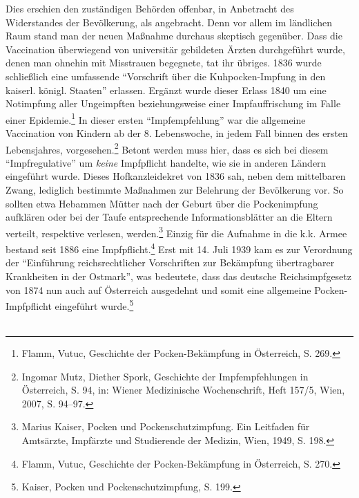 \documentclass[
    a4paper,
    12pt,
    hyphens,
    chapterprefix=true,
    headheight=33pt,
    footheight=29pt,
    headings=optiontohead, %
]{scrartcl}
\begin{document}
Dies erschien den zuständigen Behörden offenbar, in Anbetracht des Widerstandes der Bevölkerung, als angebracht. Denn vor allem im ländlichen Raum stand man der neuen Maßnahme durchaus skeptisch gegenüber. Dass die Vaccination überwiegend von universitär gebildeten Ärzten durchgeführt wurde, denen man ohnehin mit Misstrauen begegnete, tat ihr übriges. 1836 wurde schließlich eine umfassende "`Vorschrift über die Kuhpocken-Impfung in den kaiserl. königl. Staaten"' erlassen. Ergänzt wurde dieser Erlass 1840 um eine Notimpfung aller Ungeimpften beziehungsweise einer Impfauffrischung im Falle einer Epidemie.\footnote{Flamm, Vutuc, Geschichte der Pocken-Bekämpfung in Österreich, S. 269.} In dieser ersten "`Impfempfehlung"' war die allgemeine Vaccination von Kindern ab der 8. Lebenswoche, in jedem Fall binnen des ersten Lebensjahres, vorgesehen.\footnote{Ingomar Mutz, Diether Spork, Geschichte der Impfempfehlungen in Österreich, S. 94, in: Wiener Medizinische Wochenschrift, Heft 157/5, Wien, 2007, S. 94--97.} Betont werden muss hier, dass es sich bei diesem "`Impfregulative"' um \textit{keine} Impfpflicht handelte, wie sie in anderen Ländern eingeführt wurde. Dieses Hofkanzleidekret von 1836 sah, neben dem mittelbaren Zwang, lediglich bestimmte Maßnahmen zur Belehrung der Bevölkerung vor. So sollten etwa Hebammen Mütter nach der Geburt über die Pockenimpfung aufklären oder bei der Taufe entsprechende Informationsblätter an die Eltern verteilt, respektive verlesen, werden.\footnote{Marius Kaiser, Pocken und Pockenschutzimpfung. Ein Leitfaden für Amtsärzte, Impfärzte und Studierende der Medizin, Wien, 1949, S. 198.} Einzig für die Aufnahme in die k.k. Armee bestand seit 1886 eine Impfpflicht.\footnote{Flamm, Vutuc, Geschichte der Pocken-Bekämpfung in Österreich, S. 270.} Erst mit 14. Juli 1939 kam es zur Verordnung der "`Einführung reichsrechtlicher Vorschriften zur Bekämpfung übertragbarer Krankheiten in der Ostmark"', was bedeutete, dass das deutsche Reichsimpfgesetz von 1874 nun auch auf Österreich ausgedehnt und somit eine allgemeine Pocken-Impfpflicht eingeführt wurde.\footnote{Kaiser, Pocken und Pockenschutzimpfung, S. 199.}\\
\\
\end{document}
